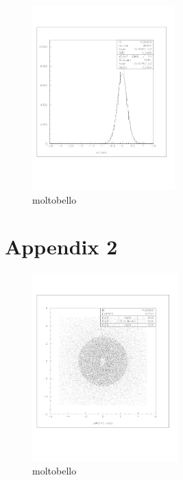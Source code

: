 \documentclass[a4paper]{article}
\begin{document}
\begin{figure}[!htb]
  \includegraphics[width=0.49\textwidth]{ex_images/1_100_140_xse.jpg}
  \caption{moltobello}
  \label{fig:100_xse}
\end{figure}


\section{Appendix 2}
\begin{figure}[!htb]
  \centering
  \includegraphics[width=0.5\textwidth]{ex_images/2_2d_10.jpg}
  \caption{moltobello}
  \label{fig:2_2d}
\end{figure}
\end{document}
